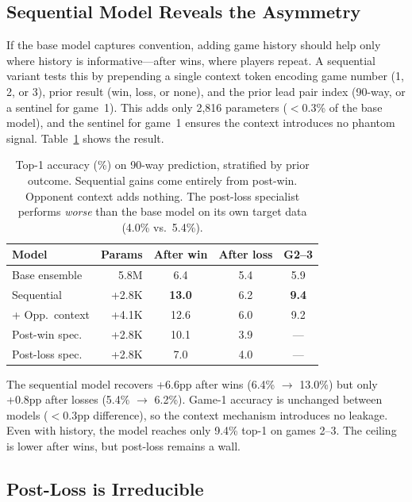 \documentclass{article}
\begin{document}
\subsection{Sequential Model Reveals the Asymmetry}
\label{sec:sequential}

If the base model captures convention, adding game history should help only where history is informative---after wins, where players repeat.
A sequential variant tests this by prepending a single context token encoding game number (1, 2, or 3), prior result (win, loss, or none), and the prior lead pair index (90-way, or a sentinel for game~1).
This adds only 2,816 parameters (${<}$0.3\% of the base model), and the sentinel for game~1 ensures the context introduces no phantom signal.
Table~\ref{tab:models} shows the result.

\begin{table}[t]
\centering
\caption{Top-1 accuracy (\%) on 90-way prediction, stratified by prior outcome. Sequential gains come entirely from post-win. Opponent context adds nothing. The post-loss specialist performs \emph{worse} than the base model on its own target data (4.0\% vs.\ 5.4\%).}
\label{tab:models}
\footnotesize
\setlength{\tabcolsep}{3pt}
\begin{tabular}{@{}lrccc@{}}
\toprule
\textbf{Model} & \textbf{Params} & \textbf{After win} & \textbf{After loss} & \textbf{G2--3} \\
\midrule
Base ensemble     & 5.8M  & 6.4 & 5.4 & 5.9 \\
Sequential        & +2.8K & \textbf{13.0} & 6.2 & \textbf{9.4} \\
+ Opp.\ context   & +4.1K & 12.6 & 6.0 & 9.2 \\
\midrule
Post-win spec.    & +2.8K & 10.1 & 3.9 & --- \\
Post-loss spec.   & +2.8K & 7.0 & 4.0 & --- \\
\bottomrule
\end{tabular}
\end{table}

The sequential model recovers +6.6pp after wins (6.4\% $\to$ 13.0\%) but only +0.8pp after losses (5.4\% $\to$ 6.2\%).
Game-1 accuracy is unchanged between models ($<$0.3pp difference), so the context mechanism introduces no leakage.
Even with history, the model reaches only 9.4\% top-1 on games 2--3.
The ceiling is lower after wins, but post-loss remains a wall.

\subsection{Post-Loss is Irreducible}
\label{sec:irreducible}
\end{document}
